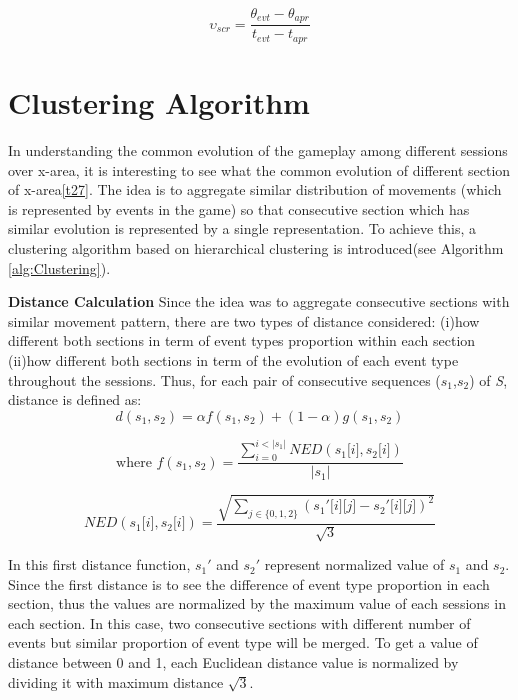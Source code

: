 $$ \upsilon_{scr} = \frac{\theta_{evt}-\theta_{apr}}{\textit{t}_{evt}-\textit{t}_{apr}} $$

\section{Clustering Algorithm}

In understanding the common evolution of the gameplay among different sessions over x-area, it is interesting to see what the common evolution of different section of x-area\ref{t27}. The idea is to aggregate similar distribution of movements (which is represented by events in the game) so that consecutive section which has similar evolution is represented by a single representation. To achieve this, a clustering algorithm based on hierarchical clustering is introduced(see Algorithm \ref{alg:Clustering}). \newline

\textbf{Distance Calculation}\newline 
Since the idea was to aggregate consecutive sections with similar movement pattern, there are two types of distance considered: (i)how different both sections in term of event types proportion within each section (ii)how different both sections in term of the evolution of each event type throughout the sessions. Thus, for each pair of consecutive sequences ($\textit{s}_1$,$\textit{s}_2$) of \textit{S}, distance is defined as:
$$d(\textit{s}_1,\textit{s}_2) = \alpha\textit{f}(\textit{s}_1,\textit{s}_2) + (1 - \alpha)\textit{g}(\textit{s}_1,\textit{s}_2)$$

$$\text{where } f(\textit{s}_1,\textit{s}_2) = \frac{\displaystyle\sum_{i=0}^{i < \lvert\textit{s}_1\lvert} \textit{N}ED(\textit{s}_1\lbrack i \rbrack,\textit{s}_2\lbrack i \rbrack)}{ \lvert\textit{s}_1\lvert}$$

$$ \textit{N}ED(\textit{s}_1\lbrack i \rbrack,\textit{s}_2\lbrack i \rbrack) = \frac{\sqrt{\displaystyle\sum_{j \in \{0,1,2\}}(\textit{s}_1'\lbrack i \rbrack\lbrack j \rbrack - \textit{s}_2'\lbrack i \rbrack\lbrack j \rbrack)^2}}{\sqrt{3}}$$

In this first distance function, $\textit{s}_1'$ and $\textit{s}_2'$ represent normalized value of $\textit{s}_1$ and $\textit{s}_2$. Since the first distance is to see the difference of event type proportion in each section, thus the values are normalized by the maximum value of each sessions in each section. In this case, two consecutive sections with different number of events but similar proportion of event type will be merged. To get a value of distance between 0 and 1, each Euclidean distance value is normalized by dividing it with maximum distance $\sqrt{3}$.

